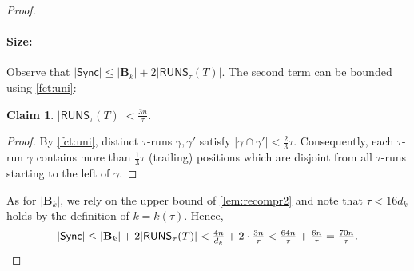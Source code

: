 \documentclass[a4paper]{article}
\theoremstyle{definition}
\newtheorem{claim}[theorem]{Claim}
\theoremstyle{remark}
\newcommand{\B}{\mathbf{B}}
\newcommand{\RUNS}{\mathsf{RUNS}}
\renewcommand{\S}{\mathsf{Sync}}
\renewcommand{\S}{\mathsf{Sync}}
\begin{document}
\begin{proof}
\paragraph*{\bf Size:}
Observe that $|\S| \le |\B_k| + 2|\RUNS_{\tau}(T)|$. 
The second term can be bounded using \cref{fct:uni}:
\begin{claim}
  $|\RUNS_{\tau}(T)| < \frac{3n}{\tau}$.
\end{claim}
\begin{proof}
  By \cref{fct:uni}, distinct $\tau$-runs $\gamma,\gamma'$ satisfy $|\gamma \cap \gamma'|< \frac23\tau$.
  Consequently, each $\tau$-run $\gamma$ contains more than $\frac13\tau$
  (trailing) positions which are disjoint from all $\tau$-runs starting to the left of $\gamma$.
\end{proof}
As for $|\B_k|$, we rely on the upper bound of \cref{lem:recompr2}
and note that $\tau < 16d_k$ holds by the definition of $k=k(\tau)$.
Hence,
\[|\S|\le |\B_k| + 2|\RUNS_{\tau}(T)|
< \tfrac{4n}{d_{k}} + 2\cdot \tfrac{3n}{\tau}
< \tfrac{64n}{\tau}+\tfrac{6n}{\tau}=\tfrac{70n}{\tau}.\qedhere\]
\end{proof}
\end{document}
